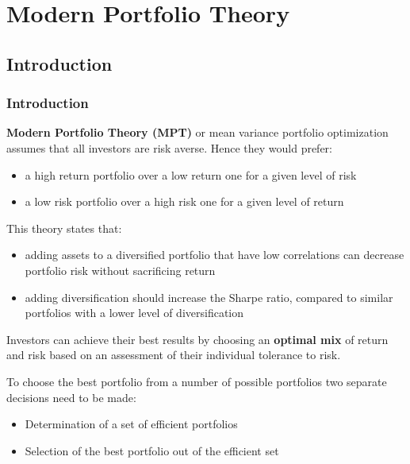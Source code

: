 \documentclass{beamer}
\begin{document}
\section{Modern Portfolio Theory}










\subsection{Introduction}

\begin{frame}
\frametitle{\textbf{Introduction}}

\justifying
\textbf{Modern Portfolio Theory (MPT)} or mean variance portfolio optimization assumes that all investors are risk averse. Hence they would prefer:
\begin{itemize}
	\item a high return portfolio over a low return one for a given level of risk
	\item a low risk portfolio over a high risk one for a given level of return
\end{itemize}

\vspace{0.8cm}
\justifying
This theory states that:
\begin{itemize}
	\item adding assets to a diversified portfolio that have low correlations can decrease portfolio risk without sacrificing return
	\item adding diversification should increase the Sharpe ratio, compared to similar portfolios with a lower level of diversification
\end{itemize}

\end{frame}



\begin{frame}

\justifying
Investors can achieve their best results by choosing an \textbf{optimal mix} of return and risk based on an assessment of their individual tolerance to risk.

\vspace{0.8cm}
\justifying
To choose the best portfolio from a number of possible portfolios two separate decisions need to be made:
\begin{itemize}
	\justifying
	\item Determination of a set of efficient portfolios
	\item Selection of the best portfolio out of the efficient set
\end{itemize}

\end{frame}
\end{document}
